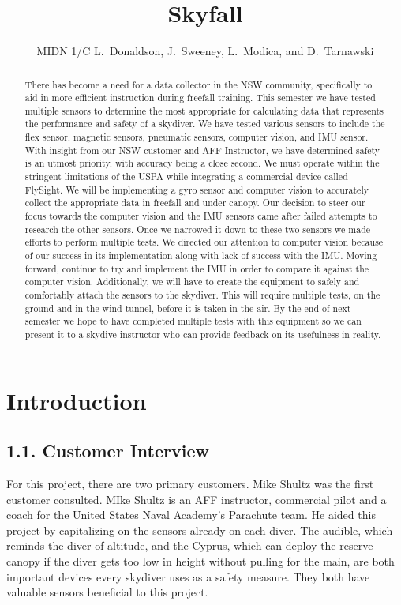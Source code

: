 \documentclass[10pt]{article}
\title{Skyfall}
\author{MIDN 1/C L.~Donaldson, J.~Sweeney, L.~Modica, and D.~Tarnawski}
\date{\printdate{12/5/2020}}
\begin{document}
\maketitlepage
\cleardoublepage
\tableofcontents

\clearpage
\maketitle

\begin{abstract}
There has become a need for a data collector in the NSW community, specifically to aid in more efficient instruction during freefall training. This semester we have tested multiple sensors to determine the most appropriate for calculating data that represents the performance and safety of a skydiver. We have tested various sensors to include the flex sensor, magnetic sensors, pneumatic sensors, computer vision, and IMU sensor. With insight from our NSW customer and AFF Instructor, we have determined safety is an utmost priority, with accuracy being a close second. We must operate within the stringent limitations of the USPA while integrating a commercial device called FlySight. We will be implementing a gyro sensor and computer vision to accurately collect the appropriate data in freefall and under canopy. Our decision to steer our focus towards the computer vision and the IMU sensors came after failed attempts to research the other sensors. Once we narrowed it down to these two sensors we made efforts to perform multiple tests. We directed our attention to computer vision because of our success in its implementation along with lack of success with the IMU. Moving forward, continue to try and implement the IMU in order to compare it against the computer vision. Additionally, we will have to create the equipment to safely and comfortably attach the sensors to the skydiver. This will require multiple tests, on the ground and in the wind tunnel, before it is taken in the air. By the end of next semester we hope to have completed multiple tests with this equipment so we can present it to a skydive instructor who can provide feedback on its usefulness in reality.
\end{abstract}

\section{Introduction}
\subsection{1.1. Customer Interview}
For this project, there are two primary customers. Mike Shultz was the first customer consulted. MIke Shultz is an AFF instructor, commercial pilot and a coach for the United States Naval Academy’s Parachute team. He aided this project by capitalizing on the sensors already on each diver. The audible, which reminds the diver of altitude, and the Cyprus, which can deploy the reserve canopy if the diver gets too low in height without pulling for the main, are both important devices every skydiver uses as a safety measure. They both have valuable sensors beneficial to this project.
\end{document}
